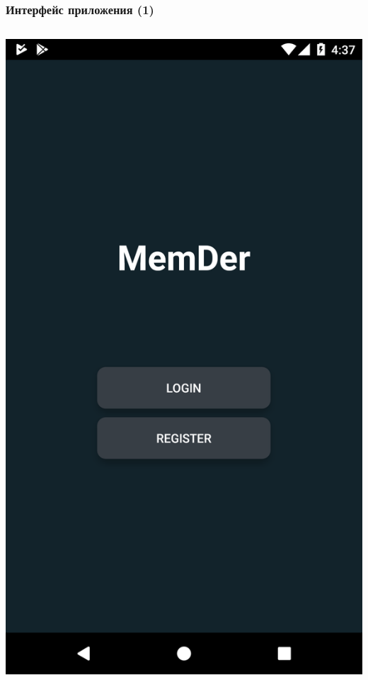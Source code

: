 \documentclass[xetex,mathserif,serif]{beamer}
\begin{document}
	\begin{frame}
		\frametitle{Интерфейс приложения (1)}
            \begin{columns}[t]
                    \includegraphics[scale=0.09]{images/login.png}

\end{columns}
\end{frame}
\end{document}
